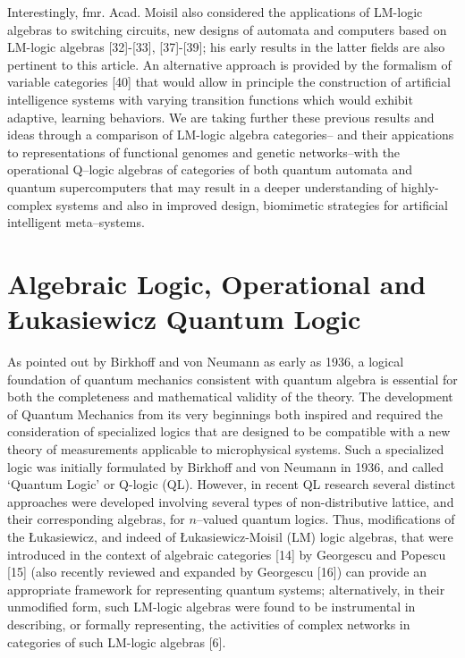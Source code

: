 \documentclass[12pt]{article}
\theoremstyle{plain}
\theoremstyle{definition}
\numberwithin{equation}{section}
\begin{document}
Interestingly, fmr. Acad. Moisil also considered the applications of LM-logic algebras to switching circuits, new designs of automata and computers based on LM-logic algebras [32]-[33], [37]-[39];  his early results in the latter fields are also pertinent to this article. An alternative approach is provided by the formalism of variable categories [40] that would allow in principle the construction of artificial intelligence systems with varying transition functions which would exhibit adaptive, learning behaviors. 
 We are taking further these previous results and ideas through a comparison of LM-logic algebra categories-- and their appications to representations of functional genomes and genetic networks--with the operational Q--logic algebras of  categories of both quantum automata and quantum supercomputers that may result in a deeper understanding of highly-complex systems and also in improved design, biomimetic strategies for artificial intelligent meta--systems. 

\section{Algebraic Logic, Operational and \L{}ukasiewicz Quantum Logic}

As pointed out by Birkhoff and von Neumann as early as 1936, a logical foundation of quantum mechanics consistent with quantum algebra is essential for both the completeness and mathematical validity of the theory. The development of Quantum Mechanics from its very beginnings both inspired and required the consideration of specialized logics that are designed to be compatible with a new theory of measurements applicable to  microphysical systems. Such a specialized logic was initially formulated by Birkhoff and von Neumann in 1936, and called `Quantum Logic' or Q-logic  (QL). However, in recent QL research several distinct approaches were developed involving several types of non-distributive lattice, and their corresponding algebras, for $n$--valued quantum logics. Thus, modifications of the \L{}ukasiewicz, and indeed of  \L{}ukasiewicz-Moisil (LM) logic algebras, that were introduced in the context of algebraic categories [14] by Georgescu and Popescu [15] (also recently reviewed and expanded by Georgescu [16]) can provide an appropriate framework for representing quantum systems; alternatively, in their unmodified form, such LM-logic algebras were found to be instrumental in describing, or formally representing, the activities of complex networks in categories of  such LM-logic algebras [6]. 
\end{document}
